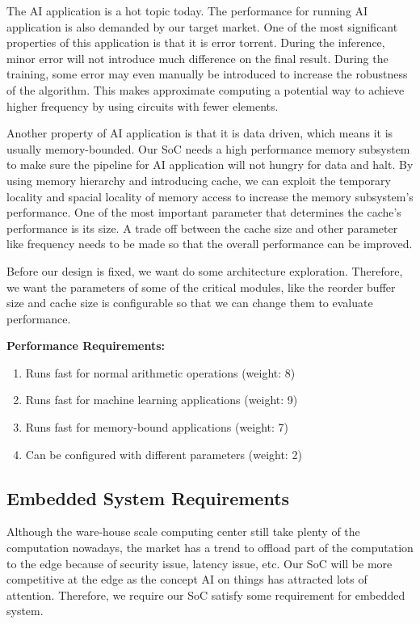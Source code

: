 The AI application is a hot topic today. The performance for running AI application is also demanded by our target market. One of the most significant properties of this application is that it is error torrent. During the inference, minor error will not introduce much difference on the final result. During the training, some error may even manually be introduced to increase the robustness of the algorithm. This makes approximate computing a potential way to achieve higher frequency by using circuits with fewer elements.

Another property of AI application is that it is data driven, which means it is usually memory-bounded. Our SoC needs a high performance memory subsystem to make sure the pipeline for AI application will not hungry for data and halt. By using memory hierarchy and introducing cache, we can exploit the temporary locality and spacial locality of memory access to increase the memory subsystem's performance. One of the most important parameter that determines the cache's performance is its size. A trade off between the cache size and other parameter like frequency needs to be made so that the overall performance can be improved.

Before our design is fixed, we want do some architecture exploration. Therefore, we want the parameters of some of the critical modules, like the reorder buffer size and cache size is configurable so that we can change them to evaluate performance.

\textbf{Performance Requirements:}
\begin{enumerate}
    \item Runs fast for normal arithmetic operations (weight: 8)
    \item Runs fast for machine learning applications (weight: 9)
    \item Runs fast for memory-bound applications (weight: 7)
    \item Can be configured with different parameters (weight: 2) %
\end{enumerate}


\subsection{Embedded System Requirements}
Although the ware-house scale computing center still take plenty of the computation nowadays, the market has a trend to offload part of the computation to the edge because of security issue, latency issue, etc. Our SoC will be more competitive at the edge as the concept AI on things has attracted lots of attention. Therefore, we require our SoC satisfy some requirement for embedded system.

